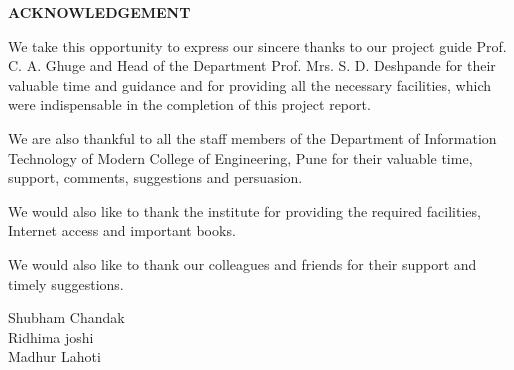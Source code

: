 \documentclass[12pt,a4paper]{article}
\begin{document}

\newpage
{}
\pagestyle{plain}           %
\begin{center}
\bf ACKNOWLEDGEMENT
\end{center}
\hspace{0.7cm}We take this opportunity to express our sincere thanks to our project guide Prof. C. A. Ghuge and Head of the Department Prof. Mrs. S. D. Deshpande for their valuable time and guidance and for providing all the necessary facilities, which were indispensable in the completion of this project report. 

We are also thankful to all the staff members of the Department of Information Technology of Modern College of Engineering, Pune for their valuable time, support, comments, suggestions and persuasion.

We would also like to thank the institute for providing the required facilities, Internet access and important books.
  
We would also like to thank our colleagues and friends for their support and timely suggestions.

\begin{flushright}
\hspace{3.5in} 
Shubham Chandak\\
Ridhima joshi\\	
Madhur Lahoti\\
\end{flushright}

\end{document}
